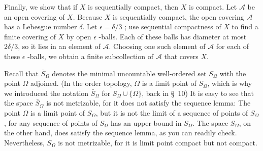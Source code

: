 Finally, we show that if \(X\) is sequentially compact, then \(X\) is compact. Let \(\mathcal{A}\) be an open covering of \(X\). Because \(X\) is sequentially compact, the open covering \(\mathcal{A}\) has a Lebesgue number \(\delta\). Let \(\epsilon = \delta /3\) ; use sequential compactness of \(X\) to find a finite covering of \(X\) by open \(\epsilon\) -balls. Each of these balls has diameter at most \({2\delta }/3\), so it lies in an element of \(\mathcal{A}\). Choosing one such element of \(\mathcal{A}\) for each of these \(\epsilon\) -balls, we obtain a finite subcollection of \(\mathcal{A}\) that covers \(X\).

\begin{centeredblock}
\begin{example}
\label{ex:\thesection.\theexample}
 Recall that \(\bar{S}_{\Omega }\) denotes the minimal uncountable well-ordered set \(S_{\Omega }\) with the point \(\Omega\) adjoined. (In the order topology, \(\Omega\) is a limit point of \(S_{\Omega }\), which is why we introduced the notation \(\bar{S}_{\Omega }\) for \(S_{\Omega } \cup \{ \Omega \}\), back in \S\ 10) It is easy to see that the space \(\bar{S}_{\Omega }\) is not metrizable, for it does not satisfy the sequence lemma: The point \(\Omega\) is a limit point of \(S_{\Omega }\), but it is not the limit of a sequence of points of \(S_{\Omega }\), for any sequence of points of \(S_{\Omega }\) has an upper bound in \(S_{\Omega }\). The space \(S_{\Omega }\), on the other hand, does satisfy the sequence lemma, as you can readily check. Nevertheless, \(S_{\Omega }\) is not metrizable, for it is limit point compact but not compact.
\end{example}
\end{centeredblock}

